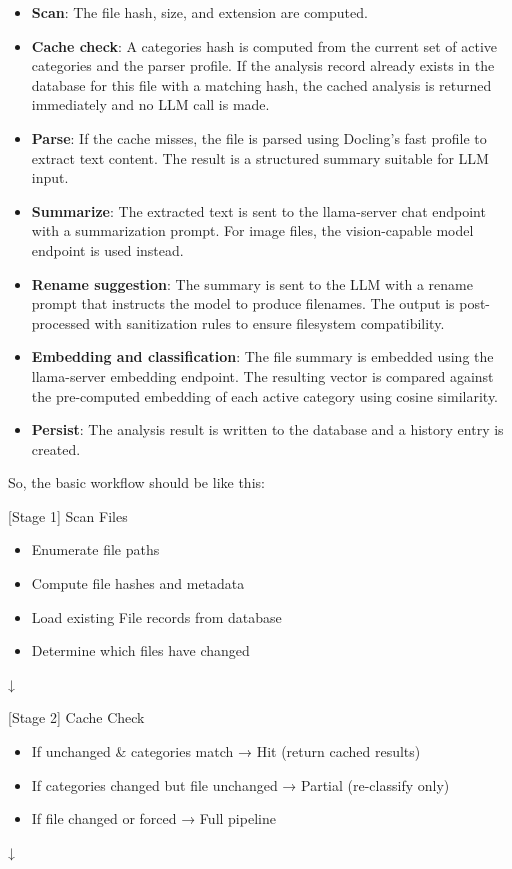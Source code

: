 \documentclass[12pt,oneside,openright,a4paper]{cpe-english-project}
\begin{document}
\begin{itemize}
\item \textbf{Scan}: The file hash, size, and extension are computed.
\item \textbf{Cache check}: A categories hash is computed from the current set of active categories and the parser profile. If the analysis record already exists in the database for this file with a matching hash, the cached analysis is returned immediately and no LLM call is made.
\item \textbf{Parse}: If the cache misses, the file is parsed using Docling's fast profile to extract text content. The result is a structured summary suitable for LLM input.
\item \textbf{Summarize}: The extracted text is sent to the llama-server chat endpoint with a summarization prompt. For image files, the vision-capable model endpoint is used instead.
\item \textbf{Rename suggestion}: The summary is sent to the LLM with a rename prompt that instructs the model to produce filenames. The output is post-processed with sanitization rules to ensure filesystem compatibility.
\item \textbf{Embedding and classification}: The file summary is embedded using the llama-server embedding endpoint. The resulting vector is compared against the pre-computed embedding of each active category using cosine similarity.
\item \textbf{Persist}: The analysis result is written to the database and a history entry is created.
\end{itemize}

So, the basic workflow should be like this:

[Stage 1] Scan Files

\begin{itemize}
\item Enumerate file paths
\item Compute file hashes and metadata
\item Load existing File records from database
\item Determine which files have changed
\end{itemize}
\noindent\hspace*{0.6in}↓

[Stage 2] Cache Check

\begin{itemize}
\item If unchanged \& categories match → Hit (return cached results)
\item If categories changed but file unchanged → Partial (re-classify only)
\item If file changed or forced → Full pipeline
\end{itemize}
\noindent\hspace*{0.6in}↓
\end{document}
